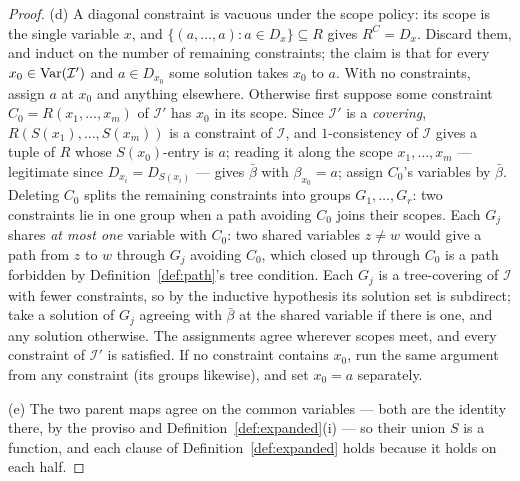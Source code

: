 \begin{proof}
(d) A diagonal constraint is vacuous under the scope policy: its scope is the
single variable $x$, and $\{(a,\dots,a):a\in D_{x}\}\subseteq R$ gives
$R^{C}=D_{x}$. Discard them, and induct on the number of remaining
constraints; the claim is that for every $x_{0}\in\operatorname{Var}(\mathcal I')$ and
$a\in D_{x_{0}}$ some solution takes $x_{0}$ to $a$. With no constraints,
assign $a$ at $x_{0}$ and anything elsewhere. Otherwise first suppose some
constraint $C_{0}=R(x_{1},\dots,x_{m})$ of $\mathcal I'$ has $x_{0}$ in its
scope. Since $\mathcal I'$ is a \emph{covering},
$R(S(x_{1}),\dots,S(x_{m}))$ is a constraint of $\mathcal I$, and
$1$-consistency of $\mathcal I$ gives a tuple of $R$ whose $S(x_{0})$-entry is
$a$; reading it along the scope $x_{1},\dots,x_{m}$ --- legitimate since
$D_{x_{i}}=D_{S(x_{i})}$ --- gives $\bar\beta$ with $\beta_{x_{0}}=a$; assign
$C_{0}$'s variables by $\bar\beta$. Deleting $C_{0}$
splits the remaining constraints into groups $G_{1},\dots,G_{r}$: two
constraints lie in one group when a path avoiding $C_{0}$ joins their scopes.
Each $G_{j}$ shares \emph{at most one} variable with $C_{0}$: two shared
variables $z\neq w$ would give a path from $z$ to $w$ through $G_{j}$ avoiding
$C_{0}$, which closed up through $C_{0}$ is a path forbidden by
Definition~\ref{def:path}'s tree condition. Each $G_{j}$ is a tree-covering of
$\mathcal I$ with fewer constraints, so by the inductive hypothesis its
solution set is subdirect; take a solution of $G_{j}$ agreeing with
$\bar\beta$ at the shared variable if there is one, and any solution
otherwise. The assignments agree wherever scopes meet, and every constraint of
$\mathcal I'$ is satisfied. If no constraint contains $x_{0}$, run the same
argument from any constraint (its groups likewise), and set $x_{0}=a$
separately.

(e) The two parent maps agree on the common variables --- both are the
identity there, by the proviso and Definition~\ref{def:expanded}(i) --- so
their union $S$ is a function, and each clause of
Definition~\ref{def:expanded} holds because it holds on each half.


\end{proof}
